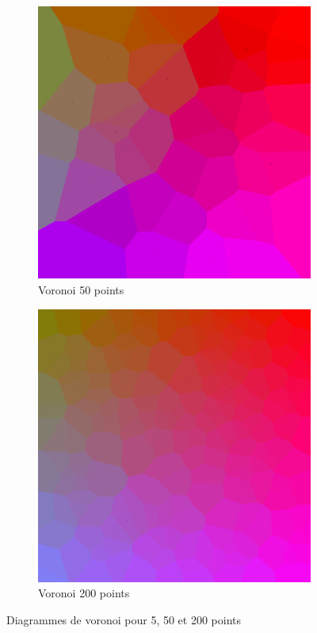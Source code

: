 \documentclass{article}
\begin{document}
\begin{figure}[h]
\begin{subfigure}{0.3\textwidth}
        \includegraphics[width=\textwidth]{voronoi_50.png}
        \caption{Voronoi 50 points}
        \label{fig:voronoi_50}
    \end{subfigure}
     \begin{subfigure}{0.3\textwidth}
        \includegraphics[width=\textwidth]{voronoi_200.png}
        \caption{Voronoi 200 points}
        \label{fig:voronoi_200}
    \end{subfigure}
    \caption{Diagrammes de voronoi pour 5, 50 et 200 points}
    \label{fig:voronoi_examples}
\end{figure}
\end{document}
